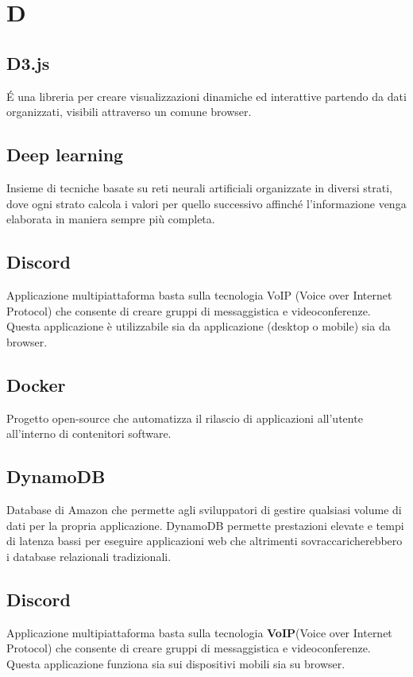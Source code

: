 \section*{D}
\markright{}
\subsection*{D3.js}
\'E una libreria  per creare visualizzazioni dinamiche ed interattive partendo da dati organizzati, visibili attraverso un comune browser.

\subsection*{Deep learning}
Insieme di tecniche basate su reti neurali artificiali organizzate in diversi strati, dove ogni strato calcola i valori per quello successivo affinché l'informazione venga elaborata in maniera sempre più completa.

\subsection*{Discord}
Applicazione multipiattaforma basta sulla tecnologia VoIP (Voice over Internet Protocol) che consente di creare gruppi di messaggistica e videoconferenze. Questa applicazione è utilizzabile sia da applicazione (desktop o mobile) sia da browser.

\subsection*{Docker}
Progetto open-source che automatizza il rilascio di applicazioni all'utente all'interno di contenitori software.

\subsection*{DynamoDB}
Database  di Amazon che permette agli sviluppatori di gestire qualsiasi volume di dati per la propria applicazione. DynamoDB permette prestazioni elevate e tempi di latenza bassi per eseguire applicazioni web che altrimenti sovraccaricherebbero i database relazionali tradizionali.

\subsection*{Discord}
Applicazione multipiattaforma basta sulla tecnologia \textbf{VoIP}(Voice over Internet Protocol) che consente di creare gruppi di messaggistica e videoconferenze. Questa applicazione funziona sia sui dispositivi mobili sia su browser.

